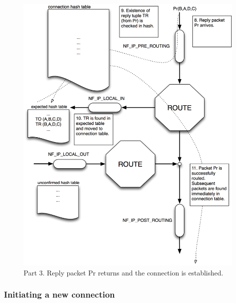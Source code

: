 \documentclass[a4paper,10pt]{article}
\begin{document}
\begin{figure}[H]
  \centering
  \includegraphics[totalheight=0.90\textheight]{images/conntrack_flow3.png}
  \caption{Part 3. Reply packet Pr returns and the connection is established.}\label{fig:conntrack_flow3}
\end{figure}

\subsubsection{Initiating a new connection}
\end{document}
